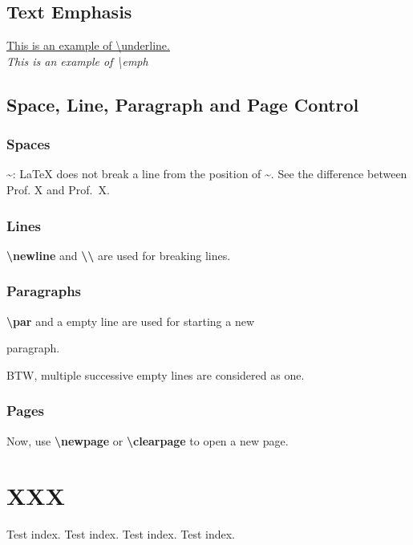 \subsection{Text Emphasis}
\underline{This is an example of \textbackslash underline.} \\
\emph{This is an example of \textbackslash emph}
\subsection{Space, Line, Paragraph and Page Control}
\subsubsection{Spaces}
\~{}: \LaTeX{} does not break a line from the position of \~{}. 
See the difference between Prof. X and Prof.~X.

\subsubsection{Lines}
\textbf{\textbackslash newline} and \textbf{\textbackslash \textbackslash} are used
for breaking \newline lines.

\subsubsection{Paragraphs}
\textbf{\textbackslash par} and a empty line are used for starting a new 
\par 
paragraph. 


BTW, multiple successive empty lines are considered as one.

\subsubsection{Pages}
Now, use \textbf{\textbackslash newpage} or \textbf{\textbackslash clearpage} to 
open a new page.

\section{XXX}
\lipsum

Test index.
\newpage
Test index.
\newpage
Test index.
\newpage
Test index.


\newpage
